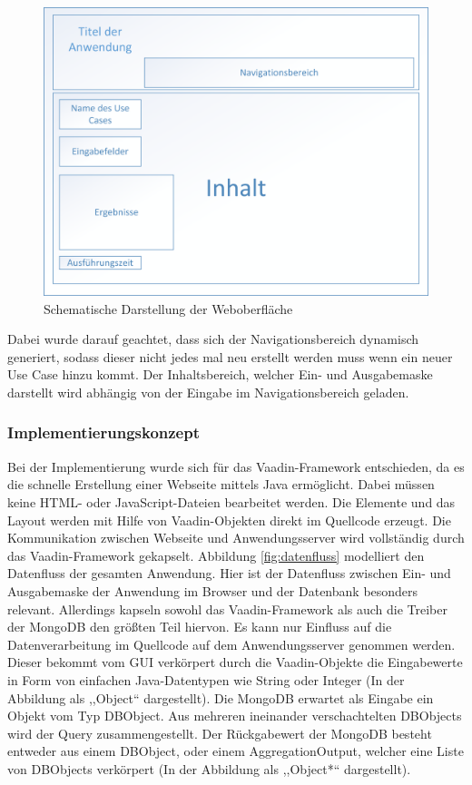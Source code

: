 \begin{figure}[H]
    \centering
    \includegraphics[scale=0.6]{images/oberflaechengestaltung.png}
    \caption{Schematische Darstellung der Weboberfläche}\label{fig:oberflaeche}
\end{figure}

Dabei wurde darauf geachtet, dass sich der Navigationsbereich dynamisch generiert, sodass dieser nicht jedes mal neu erstellt werden muss wenn ein neuer Use Case hinzu kommt. Der Inhaltsbereich, welcher Ein- und Ausgabemaske darstellt wird abhängig von der Eingabe im Navigationsbereich geladen. 

\subsubsection{Implementierungskonzept}
Bei der Implementierung wurde sich für das Vaadin-Framework entschieden, da es die schnelle Erstellung einer Webseite mittels Java ermöglicht. Dabei müssen keine HTML- oder JavaScript-Dateien bearbeitet werden. Die Elemente und das Layout werden mit Hilfe von Vaadin-Objekten direkt im Quellcode erzeugt. Die Kommunikation zwischen Webseite und Anwendungsserver wird vollständig durch das Vaadin-Framework gekapselt. Abbildung \ref{fig:datenfluss} modelliert den Datenfluss der gesamten Anwendung. Hier ist der Datenfluss zwischen Ein- und Ausgabemaske der Anwendung im Browser und der Datenbank besonders relevant. Allerdings kapseln sowohl das Vaadin-Framework als auch die Treiber der MongoDB den größten Teil hiervon. Es kann nur Einfluss auf die Datenverarbeitung im Quellcode auf dem Anwendungsserver genommen werden. Dieser bekommt vom GUI verkörpert durch die Vaadin-Objekte die Eingabewerte in Form von einfachen Java-Datentypen wie String oder Integer (In der Abbildung als ,,Object`` dargestellt). Die MongoDB erwartet als Eingabe ein Objekt vom Typ DBObject. Aus mehreren ineinander verschachtelten DBObjects wird der Query zusammengestellt. Der Rückgabewert der MongoDB besteht entweder aus einem DBObject, oder einem AggregationOutput, welcher eine Liste von DBObjects verkörpert (In der Abbildung als ,,Object*`` dargestellt). 

